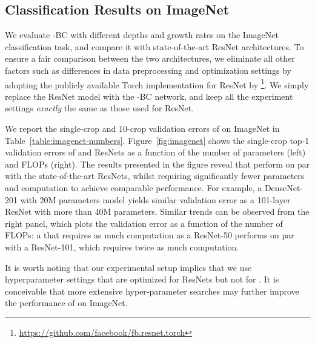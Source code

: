 \subsection{Classification Results on ImageNet}
We evaluate \methodnameshort{}-BC with different depths and growth rates on the ImageNet classification task, and compare it with state-of-the-art ResNet architectures. To ensure a fair comparison between the two architectures, we eliminate all other factors such as differences in data preprocessing and optimization settings by adopting the publicly available Torch implementation for ResNet by \cite{blogresnet}\footnote{\url{https://github.com/facebook/fb.resnet.torch}}.
We simply replace the ResNet model with the \methodnameshort{}-BC network, and keep all the experiment settings \emph{exactly} the same as those used for ResNet.

We report the single-crop and 10-crop validation errors of \methodnameshorts{} on ImageNet in Table~\ref{table:imagenet-numbers}. Figure~\ref{fig:imagenet} shows the single-crop top-1 validation errors of \methodnameshorts{} and ResNets as a function of the number of parameters (left) and FLOPs (right). The results presented in the figure reveal that \methodnameshorts{} perform on par with the state-of-the-art ResNets, whilst requiring significantly fewer parameters and computation to achieve comparable performance. For example, a DenseNet-201 with 20M parameters model yields similar validation error as a 101-layer ResNet with more than 40M parameters. Similar trends can be observed from the right panel, which plots the validation error as a function of the number of FLOPs: a \methodnameshort{} that requires as much computation as a ResNet-50 performs on par with a ResNet-101, which requires twice as much computation.

It is worth noting that our experimental setup implies that we use hyperparameter settings that are optimized for ResNets but not for \methodnameshorts{}. It is conceivable that more extensive hyper-parameter searches may further improve the performance of \methodnameshort{} on ImageNet.


